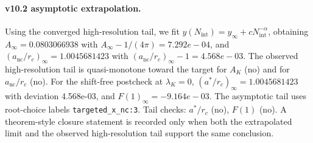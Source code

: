 \paragraph{v10.2 asymptotic extrapolation.}
Using the converged high-resolution tail, we fit $y(N_{\mathrm{int}})=y_{\infty}+cN_{\mathrm{int}}^{-\alpha}$, obtaining $A_\infty=0.0803066938$ with $A_\infty-1/(4\pi)=7.292e-04$, and $(a_{\mathrm{nc}}/r_c)_\infty=1.0045681423$ with $(a_{\mathrm{nc}}/r_c)_\infty-1=4.568e-03$. The observed high-resolution tail is quasi-monotone toward the target for $A_K$ (no) and for $a_{\mathrm{nc}}/r_c$ (no). For the shift-free postcheck at $\lambda_K=0$, $(a^*/r_c)_\infty=1.0045681423$ with deviation 4.568e-03, and $F(1)_\infty=-9.164e-03$. The asymptotic tail uses root-choice labels \texttt{targeted_x_nc:3}. Tail checks: $a^*/r_c$ (no), $F(1)$ (no). A theorem-style closure statement is recorded only when both the extrapolated limit and the
observed high-resolution tail support the same conclusion.
